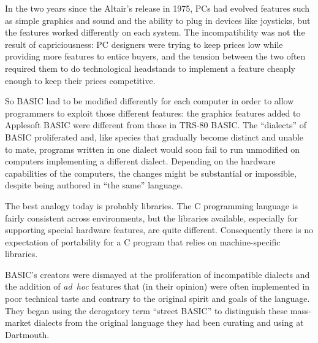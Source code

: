 
In the two years since the Altair's release in 1975, PCs had evolved 
features such as simple graphics
and sound and the ability to plug in devices like joysticks, but the
features worked differently on each system.  The incompatibility was not
the result of capriciousness: PC designers were trying to keep prices
low while providing more features to entice buyers, and the tension
between the two often required them to do technological headstands to
implement a feature cheaply enough to keep their prices competitive.

So BASIC had to be modified differently for each computer in order to
allow programmers to exploit those different features: the graphics
features added to Applesoft BASIC were different from those in TRS-80
BASIC.
The ``dialects'' of BASIC proliferated and, like species that
gradually become distinct and unable to mate, programs written in one
dialect would soon fail to run unmodified on computers implementing a
different dialect.
Depending on the hardware capabilities of the computers, the changes
might be substantial or impossible, despite being authored in ``the
same'' language.

\begin{tangent}
The best analogy today is probably libraries.  The C programming
language is fairly consistent across environments, but the libraries
available, especially for supporting special hardware features, are
quite different.  Consequently there is no expectation of portability
for a C program 
that relies on machine-specific libraries.
\end{tangent}

BASIC's creators were dismayed at the proliferation of incompatible
dialects and the addition of \emph{ad~hoc} features that (in their
opinion) were
often implemented in poor technical taste and contrary to the original
spirit and goals of 
the language.  They began using the derogatory term ``street BASIC'' to
distinguish these mass-market dialects from the original language they
had been curating and using at Dartmouth.  
